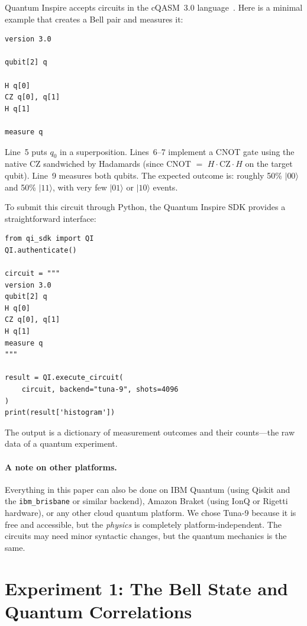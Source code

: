 \documentclass[amsmath,amssymb,reprint,aps,prb]{revtex4-2}
\newcommand{\ket}[1]{|#1\rangle}
\begin{document}
Quantum Inspire accepts circuits in the cQASM~3.0
language~\cite{cQASM}.  Here is a minimal example that creates a
Bell pair and measures it:
\begin{lstlisting}[caption={A Bell-pair circuit in cQASM 3.0.}]
version 3.0

qubit[2] q

H q[0]
CZ q[0], q[1]
H q[1]

measure q
\end{lstlisting}
Line~5 puts $q_0$ in a superposition.  Lines~6--7 implement a CNOT
gate using the native CZ sandwiched by Hadamards (since CNOT $=$ $H
\cdot \text{CZ} \cdot H$ on the target qubit).  Line~9 measures
both qubits.  The expected outcome is: roughly 50\% $\ket{00}$ and
50\% $\ket{11}$, with very few $\ket{01}$ or $\ket{10}$ events.

To submit this circuit through Python, the Quantum Inspire SDK
provides a straightforward interface:
\begin{lstlisting}[caption={Submitting a circuit via Python.}]
from qi_sdk import QI
QI.authenticate()

circuit = """
version 3.0
qubit[2] q
H q[0]
CZ q[0], q[1]
H q[1]
measure q
"""

result = QI.execute_circuit(
    circuit, backend="tuna-9", shots=4096
)
print(result['histogram'])
\end{lstlisting}
The output is a dictionary of measurement outcomes and their
counts---the raw data of a quantum experiment.

\paragraph*{A note on other platforms.}
Everything in this paper can also be done on IBM Quantum
(using Qiskit and the \texttt{ibm\_brisbane} or similar backend),
Amazon Braket (using IonQ or Rigetti hardware), or any other
cloud quantum platform.  We chose Tuna-9 because it is free and
accessible, but the \emph{physics} is completely platform-independent.
The circuits may need minor syntactic changes, but the quantum
mechanics is the same.


\section{Experiment 1: The Bell State and Quantum Correlations}
\label{sec:bell}
\end{document}
